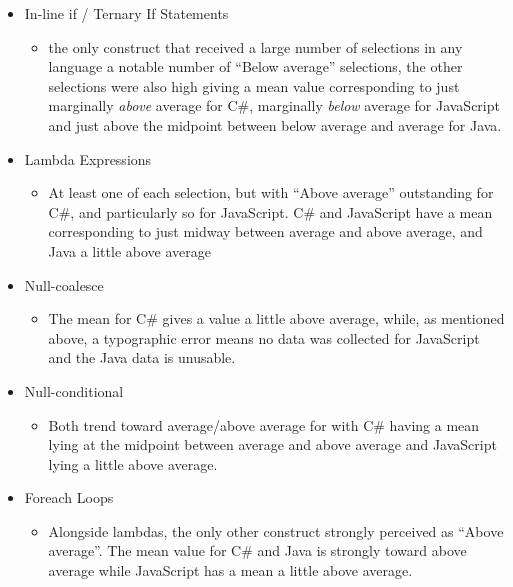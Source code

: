 \documentclass{article}
\begin{document}
            \begin{itemize}
                \item In-line if / Ternary If Statements
                \begin{itemize}
                    \item the only construct that received a large number of selections in any language a notable number of ``Below average'' selections, the other selections were also high giving a mean value corresponding to just marginally \emph{above} average for C\#, marginally \emph{below} average for JavaScript and just above the midpoint between below average and average for Java.
                \end{itemize}
                \item Lambda Expressions
                \begin{itemize}
                    \item At least one of each selection, but with ``Above average'' outstanding for C\#, and particularly so for JavaScript. C\# and JavaScript have a mean corresponding to just midway between average and above average, and Java a little above average
                \end{itemize}
                \item Null-coalesce
                \begin{itemize}
                    \item The mean for C\# gives a value a little above average, while, as mentioned above, a typographic error means no data was collected for JavaScript and the Java data is unusable.
                \end{itemize}
                \item Null-conditional
                \begin{itemize}
                    \item Both trend toward average/above average for with C\# having a mean lying at the midpoint between average and above average and JavaScript lying a little above average.
                \end{itemize}
                \item Foreach Loops
                \begin{itemize}
                    \item Alongside lambdas, the only other construct strongly perceived as ``Above average''. The mean value for C\# and Java is strongly toward above average while JavaScript has a mean a little above average.

\end{itemize}
\end{itemize}
\end{document}
